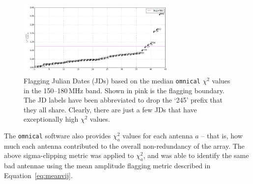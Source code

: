 \begin{figure}
\centering
\includegraphics[width=0.7\textwidth]{chapters/data_processing/figures/chisq_flagging.png}
\caption[Flagging Julian Dates based on the median {\tt omnical} $\chi^2$ values in the 150--180\,MHz band.]{Flagging Julian Dates (JDs) based on the median {\tt omnical} $\chi^2$ values in the 150--180\,MHz band. Shown in pink is the flagging boundary. The JD labels have been abbreviated to drop the `245' prefix that they all share. Clearly, there are just a few JDs that have exceptionally high $\chi^2$ values.}
\label{fig:data_chisq_flagging}
\end{figure}

The {\tt omnical} software also provides $\chi^2_a$ values for each antenna $a$ -- that is, how much each antenna contributed to the overall non-redundancy of the array. The above sigma-clipping metric was applied to $\chi^2_a$, and was able to identify the same bad antennae using the mean amplitude flagging metric described in Equation~\ref{eq:meanvij}.
